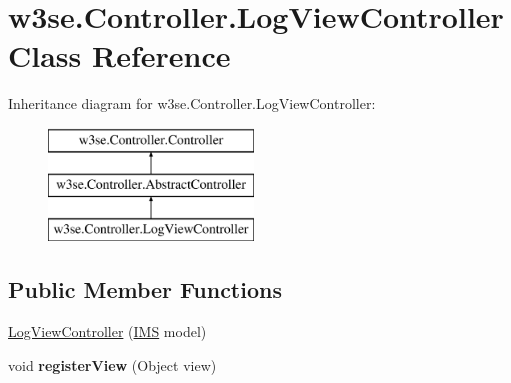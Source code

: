 \hypertarget{classw3se_1_1_controller_1_1_log_view_controller}{\section{w3se.\-Controller.\-Log\-View\-Controller Class Reference}
\label{classw3se_1_1_controller_1_1_log_view_controller}
}
Inheritance diagram for w3se.\-Controller.\-Log\-View\-Controller\-:\begin{figure}[H]
\begin{center}
\leavevmode
\includegraphics[height=3.000000cm]{classw3se_1_1_controller_1_1_log_view_controller}
\end{center}
\end{figure}
\subsection*{Public Member Functions}
\begin{DoxyCompactItemize}
\item 
\hyperlink{classw3se_1_1_controller_1_1_log_view_controller_a9812d510bb1801b9ea4ff3b1e3f99c44}{Log\-View\-Controller} (\hyperlink{classw3se_1_1_model_1_1_i_m_s}{I\-M\-S} model)
\item 
\hypertarget{classw3se_1_1_controller_1_1_log_view_controller_a92030b50bad277cb00c98701e7c81d3e}{void {\bfseries register\-View} (Object view)}\label{classw3se_1_1_controller_1_1_log_view_controller_a92030b50bad277cb00c98701e7c81d3e}

\end{DoxyCompactItemize}
